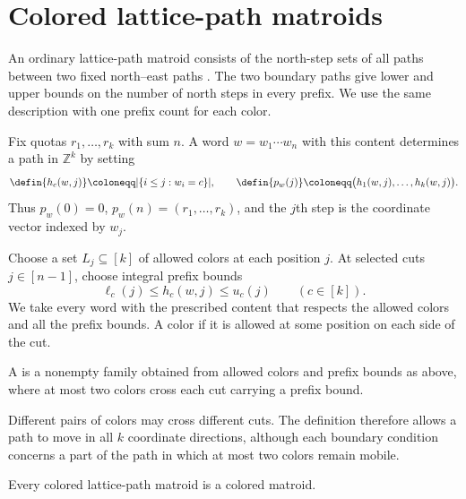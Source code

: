 
\section[coloredLatticePaths]{Colored lattice-path matroids}

An ordinary lattice-path matroid consists of the north-step sets of all paths
between two fixed north--east paths \cite{BoninMierNoy2003}. The two boundary
paths give lower and upper bounds on the number of north steps in every
prefix. We use the same description with one prefix count for each color.

Fix quotas $r_1,\dotsc,r_k$ with sum $n$. A word
$w=w_1\dotsm w_n$ with this content determines a path in $\mathbb Z^k$ by
setting
\[
 \defin{h_c(w,j)}\coloneqq |\{i\leq j:w_i=c\}|,
 \qquad
 \defin{p_w(j)}\coloneqq
 \bigl(h_1(w,j),\dotsc,h_k(w,j)\bigr).
\]
Thus $p_w(0)=0$, $p_w(n)=(r_1,\dotsc,r_k)$, and the $j$th step is the
coordinate vector indexed by $w_j$.

Choose a set $L_j\subseteq[k]$ of allowed colors at each position $j$.
At selected cuts $j\in[n-1]$, choose integral prefix bounds
\[
 \ell_c(j)\leq h_c(w,j)\leq u_c(j)
 \qquad(c\in[k]).
\]
We take every word with the prescribed content that respects the allowed
colors and all the prefix bounds. A color  if it
is allowed at some position on each side of the cut.

\begin{definition}
A  is a nonempty family obtained from
allowed colors and prefix bounds as above, where at most two colors cross
each cut carrying a prefix bound.
\end{definition}

Different pairs of colors may cross different cuts. The definition therefore
allows a path to move in all $k$ coordinate directions, although each
boundary condition concerns a part of the path in which at most two colors
remain mobile.

\begin{theorem}
Every colored lattice-path matroid is a colored matroid.
\end{theorem}

